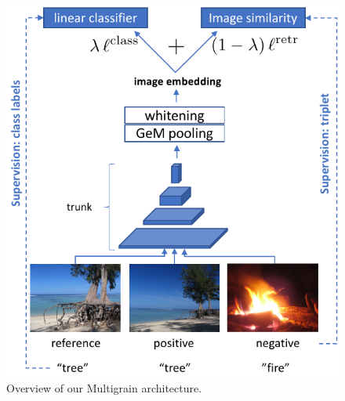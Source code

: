 %
\begin{figure}
\centering
\includegraphics[width=0.9\linewidth]{figs/multigrain_rv}
\caption{\label{fig:3arch}
 Overview of our Multigrain architecture.} %
 \vspace{-10pt}
\end{figure}